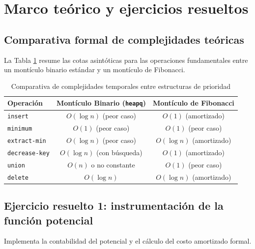 \section{Marco teórico y ejercicios resueltos}

\subsection{Comparativa formal de complejidades teóricas}
La Tabla \ref{tab:complejidad_teorica} resume las cotas asintóticas para las operaciones fundamentales entre un montículo binario estándar y un montículo de Fibonacci.

\begin{table}[H]
    \caption{Comparativa de complejidades temporales entre estructuras de prioridad}
    \label{tab:complejidad_teorica}
    \centering
    \small
    \begin{tabular*}{\textwidth}{@{\extracolsep{\fill}}lcc}
        \toprule
        \textbf{Operación} & \textbf{Montículo Binario (\texttt{heapq})} & \textbf{Montículo de Fibonacci} \\
        \midrule
        \texttt{insert} & $O(\log n)$ (peor caso) & $O(1)$ (amortizado) \\
        \texttt{minimum} & $O(1)$ (peor caso) & $O(1)$ (peor caso) \\
        \texttt{extract-min} & $O(\log n)$ (peor caso) & $O(\log n)$ (amortizado) \\
        \texttt{decrease-key} & $O(\log n)$ (con búsqueda) & $O(1)$ (amortizado) \\
        \texttt{union} & $O(n)$ o no constante & $O(1)$ (peor caso) \\
        \texttt{delete} & $O(\log n)$ & $O(\log n)$ (amortizado) \\
        \bottomrule
    \end{tabular*}
\end{table}

\subsection{Ejercicio resuelto 1: instrumentación de la función potencial}
Implementa la contabilidad del potencial y el cálculo del costo amortizado formal.


